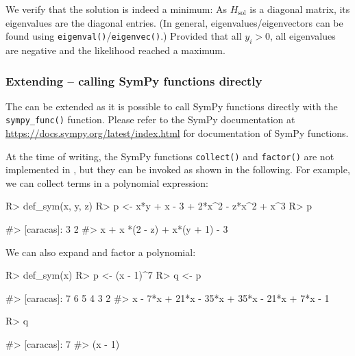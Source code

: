 We verify that the solution is indeed a minimum: As \(H_{\text{sol}}\)
is a diagonal matrix, its eigenvalues are the diagonal entries. (In
general, eigenvalues/eigenvectors can be found using
\texttt{eigenval()}/\texttt{eigenvec()}.) Provided that all \(y_i > 0\),
all eigenvalues are negative and the likelihood reached a maximum.

\hypertarget{extending-calling-sympy-functions-directly}{%
\subsubsection{\texorpdfstring{Extending  -- calling
SymPy functions
directly}{Extending  -- calling SymPy functions directly}}\label{extending-calling-sympy-functions-directly}}

The  can be extended as it is possible to call SymPy
functions directly with the \texttt{sympy\_func()} function. Please
refer to the SymPy documentation at
\url{https://docs.sympy.org/latest/index.html} for documentation of
SymPy functions.

At the time of writing, the SymPy functions \texttt{collect()} and
\texttt{factor()} are not implemented in , but they can
be invoked as shown in the following. For example, we can collect terms
in a polynomial expression:

\begin{Schunk}
\begin{Sinput}
R> def_sym(x, y, z)
R> p <- x*y + x - 3 + 2*x^2 - z*x^2 + x^3
R> p %
\end{Sinput}
\begin{Soutput}
#> [caracas]:  3    2                        
#>            x  + x *(2 - z) + x*(y + 1) - 3
\end{Soutput}
\end{Schunk}

We can also expand and factor a polynomial:

\begin{Schunk}
\begin{Sinput}
R> def_sym(x)
R> p <- (x - 1)^7
R> q <- p %
\end{Sinput}
\begin{Soutput}
#> [caracas]:  7      6       5       4       3       2          
#>            x  - 7*x  + 21*x  - 35*x  + 35*x  - 21*x  + 7*x - 1
\end{Soutput}
\begin{Sinput}
R> q %
\end{Sinput}
\begin{Soutput}
#> [caracas]:        7
#>            (x - 1)
\end{Soutput}
\end{Schunk}

